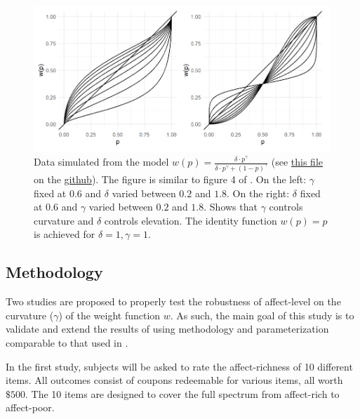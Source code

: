 \documentclass[12pt]{article}
\begin{document}
\begin{figure}[H]
	\includegraphics[width = \linewidth]{../Figures/Fig2.png}
	\caption{Data simulated from the model
		$w(p) = \frac{\delta \cdot p^{\gamma}}
	{\delta \cdot p^{\gamma} +
	(1-p)^{\gamma}}$ (see
		\href{https://github.com/victor-m-p/BayesianDecisionWeights/blob/main/Code/0_visualize_parameters.Rmd}
		{this file} on the
		\href{https://github.com/victor-m-p/BayesianDecisionWeights}{github}). The figure
	is similar to figure 4
	of \textcite{gonzalez1999shape}.
	On the left: $\gamma$ fixed at $0.6$
	and $\delta$ varied between $0.2$ and $1.8$.
	On the right: $\delta$ fixed at $0.6$
	and $\gamma$ varied between $0.2$ and $1.8$.
	Shows that $\gamma$  controls
	curvature and $\delta$ controls
	elevation. The identity function $w(p) = p$
	is achieved for $\delta = 1, \gamma = 1$.}
\end{figure}

\subsection{Methodology}

Two studies are proposed to
properly test the robustness
of affect-level on the
curvature ($\gamma$) of the
weight function $w$. As such, the
main goal of this study is to validate
and extend the results of
\autocite{rottenstreich2001money}
using methodology and parameterization
comparable to that used in
\autocite{gonzalez1999shape}.

\vspace{3mm}

In the first study, subjects will be asked to
rate the affect-richness of 10 different
items.
All outcomes
consist of coupons redeemable
for various items, all worth $\$500$.
The 10 items are designed to cover the
full spectrum from affect-rich to
affect-poor.

\vspace{3mm}
\end{document}
